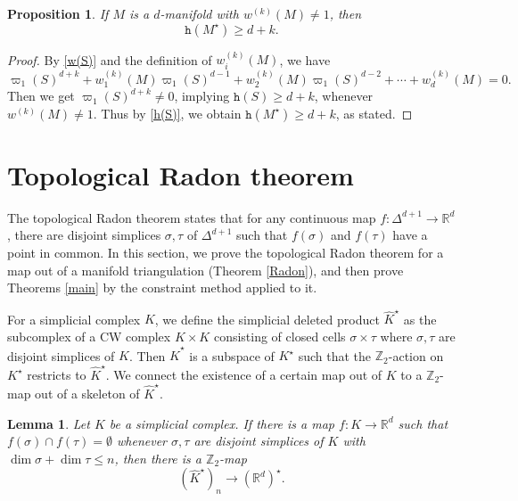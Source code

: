 \documentclass[amsfonts]{amsart}
\numberwithin{equation}{section}
\newtheorem{proposition}[theorem]{Proposition}
\newtheorem{lemma}[theorem]{Lemma}
\theoremstyle{definition}
\theoremstyle{remark}
\newcommand{\Z}{\mathbb{Z}}
\newcommand{\R}{\mathbb{R}}
\newcommand{\h}{\mathtt{h}}
\begin{document}
  \begin{proposition}
    \label{h(M)}
    If $M$ is a $d$-manifold with $w^{(k)}(M)\ne 1$, then
    \[
      \h(M^\star)\ge d+k.
    \]
  \end{proposition}

  \begin{proof}
    By \eqref{w(S)} and the definition of $w^{(k)}_i(M)$, we have
    \[
      \varpi_1(S)^{d+k}+w_1^{(k)}(M)\varpi_1(S)^{d-1}+w_2^{(k)}(M)\varpi_1(S)^{d-2}+\cdots+w_d^{(k)}(M)=0.
    \]
    Then we get $\varpi_1(S)^{d+k}\ne 0$, implying $\h(S)\ge d+k$, whenever $w^{(k)}(M)\ne 1$. Thus by \eqref{h(S)}, we obtain $\h(M^\star)\ge d+k$, as stated.
  \end{proof}




  \section{Topological Radon theorem}

  The topological Radon theorem \cite{BB} states that for any continuous map $f\colon\Delta^{d+1}\to\R^d$, there are disjoint simplices $\sigma,\tau$ of $\Delta^{d+1}$ such that $f(\sigma)$ and $f(\tau)$ have a point in common. In this section, we prove the  topological Radon theorem for a map out of a manifold triangulation (Theorem \ref{Radon}), and then prove Theorems \ref{main} by the constraint method \cite{BFZ} applied to it.



  For a simplicial complex $K$, we define the simplicial deleted product $\widehat{K}^\star$ as the subcomplex of a CW complex $K\times K$ consisting of closed cells $\sigma\times\tau$ where $\sigma,\tau$ are disjoint simplices of $K$. Then $\widehat{K}^\star$ is a subspace of $K^\star$ such that the $\Z_2$-action on $K^\star$ restricts to $\widehat{K}^\star$. We connect the existence of a certain map out of $K$ to a $\Z_2$-map out of a skeleton of $\widehat{K}^\star$.



  \begin{lemma}
    \label{embedding}
    Let $K$ be a simplicial complex. If there is a map $f\colon K\to\R^d$ such that $f(\sigma)\cap f(\tau)=\emptyset$ whenever $\sigma,\tau$ are disjoint simplices of $K$ with $\dim\sigma+\dim\tau\le n$, then there is a $\Z_2$-map
    \[
      (\widehat{K}^\star)_n\to(\R^d)^\star.
    \]
  \end{lemma}
\end{document}
